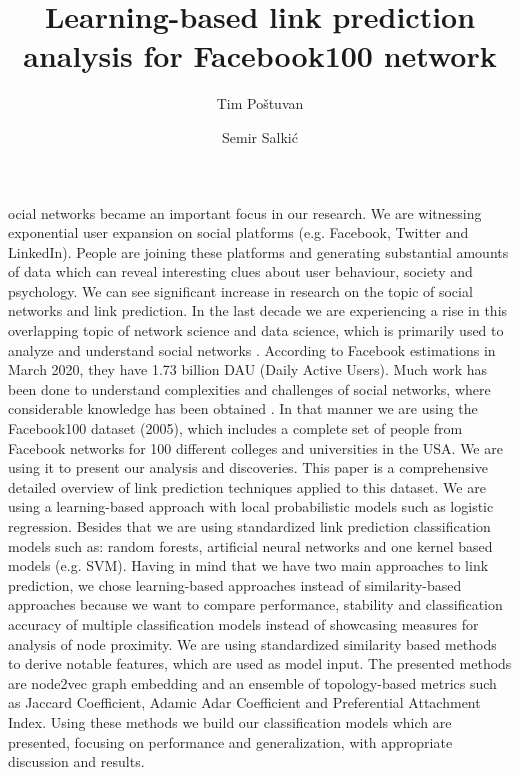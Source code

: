 \documentclass[9pt,twocolumn,twoside]{pnas-new}
\title{Learning-based link prediction analysis for Facebook100 network}
\author[a,b,1]{Tim Poštuvan}
\author[a,2]{Semir Salkić}
\affil[a]{University of Ljubljana, Faculty of Computer and Information Science, Ljubljana, Slovenia}
\affil[b]{University of Ljubljana, Faculty of Mathematics and Physics, Ljubljana, Slovenia}
\begin{document}
\maketitle
\thispagestyle{firststyle}


ocial networks became an important focus in our research. We are witnessing exponential user expansion on social platforms (e.g. Facebook, Twitter and LinkedIn). People are joining these platforms and generating substantial amounts of data which can reveal interesting clues about user behaviour, society and psychology. We can see significant increase in research on the topic of social networks and link prediction. In the last decade we are experiencing a rise in this overlapping topic of network science and data science, which is primarily used to analyze and understand social networks \cite{WangSurvey2015}. According to Facebook estimations in March 2020, they have 1.73 billion DAU (Daily Active Users). Much work has been done to understand complexities and challenges of social networks, where considerable knowledge has been obtained \cite{soc1988, pow2012} .
In that manner we are using the Facebook100 dataset (2005), which includes a complete set of people from Facebook networks for 100 different colleges and universities in the USA. We are using it to present our analysis and discoveries. This paper is a comprehensive detailed overview of link prediction techniques applied to this dataset. 
We are using a learning-based approach with local probabilistic models such as logistic regression. Besides that we are using standardized link prediction classification models such as: random forests, artificial neural networks and one kernel based models (e.g. SVM). Having in mind that we have two main approaches to link prediction, we chose learning-based approaches instead of similarity-based approaches because we want to compare performance, stability and classification accuracy of multiple classification models instead of showcasing measures for analysis of node proximity. We are using standardized similarity based methods to derive notable features, which are used as model input. The presented methods are node2vec graph embedding and an ensemble of topology-based metrics such as Jaccard Coefficient, Adamic Adar Coefficient and Preferential Attachment Index. Using these methods we build our classification models which are presented, focusing on performance and generalization, with appropriate discussion and results.
\end{document}
